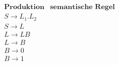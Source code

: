 \documentclass[a4paper,10pt]{scrartcl}
\begin{document}
\section{}
\[
    \begin{array}{l|l}
        \textbf{Produktion} & \textbf{semantische Regel}                \\\hline\hline
        S \to L_1.L_2       &                                           \\
        S \to L             &                                           \\
        L \to LB            &                                           \\
        L \to B             &                                           \\
        B \to 0             &                                           \\
        B \to 1             & 
    \end{array}
\]
\end{document}
